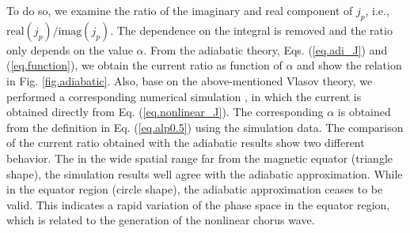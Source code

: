 To do so, we examine the ratio of the imaginary and real component of $j_p$, i.e., $\mathrm{real}(j_p)/\mathrm{imag}(j_p)$. The dependence on the integral is removed and the ratio only depends on the value $\alpha$.
From the adiabatic theory, Eqs. (\ref{eq.adi_J}) and (\ref{eq.function}), we obtain the current ratio as function of $\alpha$ and show the relation in Fig. \ref{fig.adiabatic}.
Also, base on the above-mentioned Vlasov theory, we performed a corresponding numerical simulation \cite{zheng2023b}, in which the current is obtained directly from Eq. (\ref{eq.nonlinear_J}).
The corresponding $\alpha$ is obtained from the definition in Eq. (\ref{eq.alp0.5}) using the simulation data.
The comparison of the current ratio obtained with the adiabatic results show two different behavior.
The in the wide spatial range far from the magnetic equator (triangle shape), the simulation results well agree with the adiabatic approximation. While in the equator region (circle shape), the adiabatic approximation ceases to be valid. 
This indicates a rapid variation of the phase space in the equator region, which is related to the generation of the nonlinear chorus wave.